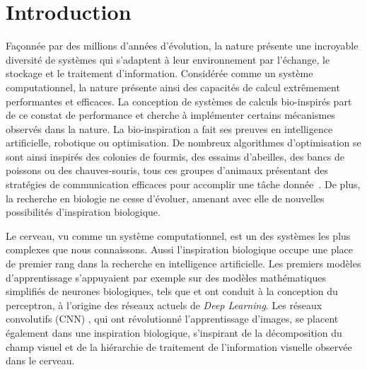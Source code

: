 \chapter*{Introduction}

Façonnée par des millions d'années d'évolution, la nature présente une incroyable diversité de systèmes qui s'adaptent à leur environnement par l'échange, le stockage et le traitement d'information.
Considérée comme un système computationnel, la nature présente ainsi des capacités de calcul extrêmement performantes et efficaces. La conception de systèmes de calculs bio-inspirés part de ce constat de performance et cherche à implémenter certains mécanismes observés dans la nature.
La bio-inspiration a fait ses preuves en intelligence artificielle, robotique ou optimisation. De nombreux algorithmes d'optimisation se sont ainsi inspirés des colonies de fourmis, des essaims d'abeilles, des bancs de poissons ou des chauves-souris, tous ces groupes d'animaux présentant des stratégies de communication efficaces pour accomplir une tâche donnée~\parencite{Darwish2018BioinspiredCA}.
De plus, la recherche en biologie ne cesse d'évoluer, amenant avec elle de nouvelles possibilités d'inspiration biologique.

Le cerveau, vu comme un système computationnel, est un des systèmes les plus complexes que nous connaissons.
Aussi l'inspiration biologique occupe une place de premier rang dans la recherche en intelligence artificielle. Les premiers modèles d'apprentissage s'appuyaient par exemple sur des modèles mathématiques simplifiés de neurones biologiques, tels que \cite{McCulloch1990ALC} et ont conduit à la conception du perceptron, à l'origine des réseaux actuels de \emph{Deep Learning}. Les réseaux convolutifs (CNN) \parencite{LeCun1998ConvolutionalNF}, qui ont révolutionné l'apprentissage d'images, se placent également dans une inspiration biologique, s'inspirant de la décomposition du champ visuel et de la hiérarchie de traitement de l'information visuelle observée dans le cerveau.

